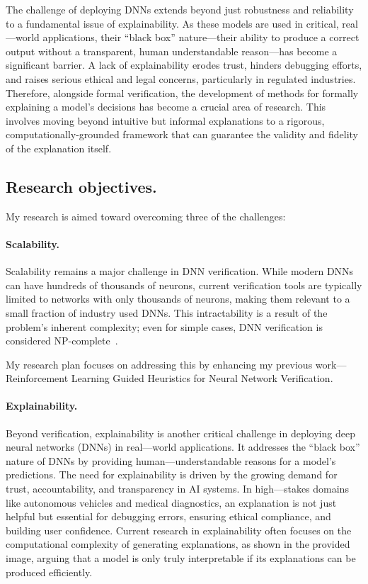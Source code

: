 \documentclass{llncs}
\begin{document}
The challenge of deploying DNNs extends beyond just robustness and reliability to a fundamental issue of explainability. 
As these models are used in critical, real---world applications, their ``black box'' nature—their ability to produce a correct output without a transparent, 
human understandable reason—has become a significant barrier. A lack of explainability erodes trust, hinders debugging efforts, 
and raises serious ethical and legal concerns, particularly in regulated industries. Therefore, alongside formal verification, 
the development of methods for formally explaining a model's decisions has become a crucial area of research. 
This involves moving beyond intuitive but informal explanations to a rigorous, computationally-grounded framework that can guarantee the 
validity and fidelity of the explanation itself.

\subsection{Research objectives.}
My research is aimed toward overcoming three of the challenges:
\paragraph{Scalability.} Scalability remains a major challenge in DNN verification. 
While modern DNNs can have hundreds of thousands of neurons, current verification tools 
are typically limited to networks with only thousands of neurons, making them relevant to 
a small fraction of industry used DNNs. This intractability is a result of the problem's inherent complexity; 
even for simple cases, DNN verification is considered NP-complete~\cite{KBD17}.

My research plan focuses on addressing this by enhancing my previous work--- Reinforcement Learning Guided 
Heuristics for Neural Network Verification.
\paragraph{Explainability.}
Beyond verification, explainability is another critical challenge in deploying deep neural networks (DNNs) 
in real---world applications. It addresses the ``black box'' nature of DNNs by providing human---understandable 
reasons for a model's predictions. The need for explainability is driven by the growing demand for trust, 
accountability, and transparency in AI systems. In high---stakes domains like autonomous vehicles and medical 
diagnostics, an explanation is not just helpful but essential for debugging errors, ensuring ethical compliance, 
and building user confidence. Current research in explainability often focuses on the computational complexity 
of generating explanations, as shown in the provided image, arguing that a model is only truly interpretable 
if its explanations can be produced efficiently.
\end{document}
